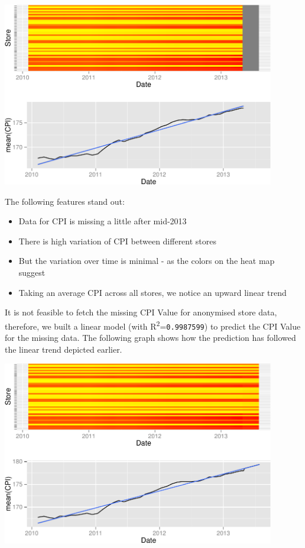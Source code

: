 \documentclass[]{article}
\begin{document}
\includegraphics[width=450px]{PredictingWeeklySalesAtWalmart_files/figure-latex/CPIMissingHeatMap-1}

The following features stand out:

\begin{itemize}
\itemsep1pt\parskip0pt
\item
  Data for CPI is missing a little after mid-2013
\item
  There is high variation of CPI between different stores
\item
  But the variation over time is minimal - as the colors on the heat map
  suggest
\item
  Taking an average CPI across all stores, we notice an upward linear
  trend
\end{itemize}

It is not feasible to fetch the missing CPI Value for anonymised store
data, therefore, we built a linear model (with
R\textsuperscript{2}=\texttt{0.9987599}) to predict the CPI Value for
the missing data. The following graph shows how the prediction has
followed the linear trend depicted earlier.

\includegraphics[width=450px]{PredictingWeeklySalesAtWalmart_files/figure-latex/predictingCPIValues-1}
\end{document}
